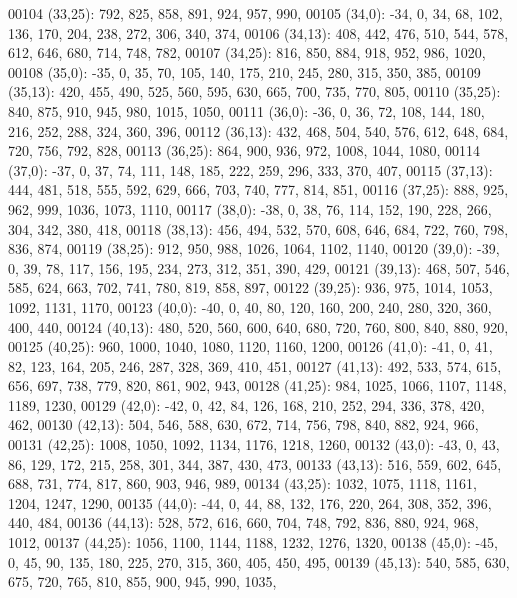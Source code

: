 \begin{DoxyCode}
00104       (33,25): 792, 825, 858, 891, 924, 957, 990,
00105       (34,0): -34, 0, 34, 68, 102, 136, 170, 204, 238, 272, 306, 340, 374,
00106       (34,13): 408, 442, 476, 510, 544, 578, 612, 646, 680, 714, 748, 782,
00107       (34,25): 816, 850, 884, 918, 952, 986, 1020,
00108       (35,0): -35, 0, 35, 70, 105, 140, 175, 210, 245, 280, 315, 350, 385,
00109       (35,13): 420, 455, 490, 525, 560, 595, 630, 665, 700, 735, 770, 805,
00110       (35,25): 840, 875, 910, 945, 980, 1015, 1050,
00111       (36,0): -36, 0, 36, 72, 108, 144, 180, 216, 252, 288, 324, 360, 396,
00112       (36,13): 432, 468, 504, 540, 576, 612, 648, 684, 720, 756, 792, 828,
00113       (36,25): 864, 900, 936, 972, 1008, 1044, 1080,
00114       (37,0): -37, 0, 37, 74, 111, 148, 185, 222, 259, 296, 333, 370, 407,
00115       (37,13): 444, 481, 518, 555, 592, 629, 666, 703, 740, 777, 814, 851,
00116       (37,25): 888, 925, 962, 999, 1036, 1073, 1110,
00117       (38,0): -38, 0, 38, 76, 114, 152, 190, 228, 266, 304, 342, 380, 418,
00118       (38,13): 456, 494, 532, 570, 608, 646, 684, 722, 760, 798, 836, 874,
00119       (38,25): 912, 950, 988, 1026, 1064, 1102, 1140,
00120       (39,0): -39, 0, 39, 78, 117, 156, 195, 234, 273, 312, 351, 390, 429,
00121       (39,13): 468, 507, 546, 585, 624, 663, 702, 741, 780, 819, 858, 897,
00122       (39,25): 936, 975, 1014, 1053, 1092, 1131, 1170,
00123       (40,0): -40, 0, 40, 80, 120, 160, 200, 240, 280, 320, 360, 400, 440,
00124       (40,13): 480, 520, 560, 600, 640, 680, 720, 760, 800, 840, 880, 920,
00125       (40,25): 960, 1000, 1040, 1080, 1120, 1160, 1200,
00126       (41,0): -41, 0, 41, 82, 123, 164, 205, 246, 287, 328, 369, 410, 451,
00127       (41,13): 492, 533, 574, 615, 656, 697, 738, 779, 820, 861, 902, 943,
00128       (41,25): 984, 1025, 1066, 1107, 1148, 1189, 1230,
00129       (42,0): -42, 0, 42, 84, 126, 168, 210, 252, 294, 336, 378, 420, 462,
00130       (42,13): 504, 546, 588, 630, 672, 714, 756, 798, 840, 882, 924, 966,
00131       (42,25): 1008, 1050, 1092, 1134, 1176, 1218, 1260,
00132       (43,0): -43, 0, 43, 86, 129, 172, 215, 258, 301, 344, 387, 430, 473,
00133       (43,13): 516, 559, 602, 645, 688, 731, 774, 817, 860, 903, 946, 989,
00134       (43,25): 1032, 1075, 1118, 1161, 1204, 1247, 1290,
00135       (44,0): -44, 0, 44, 88, 132, 176, 220, 264, 308, 352, 396, 440, 484,
00136       (44,13): 528, 572, 616, 660, 704, 748, 792, 836, 880, 924, 968, 1012,
00137       (44,25): 1056, 1100, 1144, 1188, 1232, 1276, 1320,
00138       (45,0): -45, 0, 45, 90, 135, 180, 225, 270, 315, 360, 405, 450, 495,
00139       (45,13): 540, 585, 630, 675, 720, 765, 810, 855, 900, 945, 990, 1035,

\end{DoxyCode}
